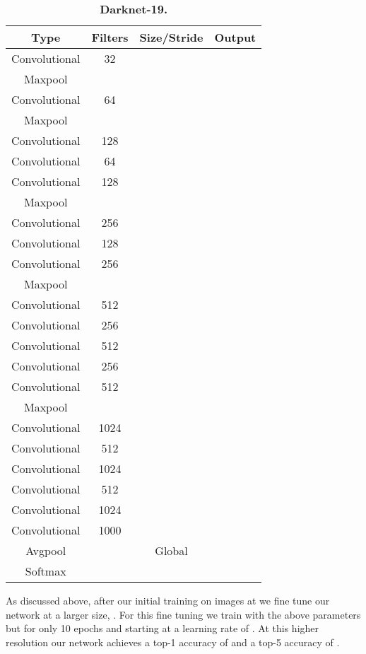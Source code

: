 \documentclass[10pt,twocolumn,letterpaper]{article}
\begin{document}
\begin{table}[h] \scriptsize
\begin{center}
\begin{tabular}{c|c|c|c}
Type & Filters & Size/Stride & Output\\
\hline
Convolutional & 32 &  &  \\
Maxpool & & &  \\
Convolutional & 64 &  &  \\
Maxpool & &  &  \\
Convolutional & 128 & &  \\
Convolutional & 64 & &  \\
Convolutional & 128 & &  \\
Maxpool & &  &  \\
Convolutional & 256 &  &  \\
Convolutional & 128 &  &  \\
Convolutional & 256&  &  \\
Maxpool & &  &  \\
Convolutional & 512 &  &  \\
Convolutional & 256&  &  \\
Convolutional & 512 &  &  \\
Convolutional & 256&  &  \\
Convolutional & 512 &  &  \\
Maxpool & &  &  \\
Convolutional & 1024 &  &  \\
Convolutional & 512 &  &  \\
Convolutional & 1024 &  &  \\
Convolutional & 512 &  &  \\
Convolutional & 1024 &  &  \\
\hline
\hline
Convolutional & 1000 &  &  \\
Avgpool & & Global &  \\
Softmax & & &\\
\end{tabular}
\end{center}
\caption{\small \textbf{Darknet-19.}}
\label{net}
\end{table}

As discussed above, after our initial training on images at  we fine tune our network at a larger size, . For this fine tuning we train with the above parameters but for only 10 epochs and starting at a learning rate of . At this higher resolution our network achieves a top-1 accuracy of  and a top-5 accuracy of .
\end{document}
